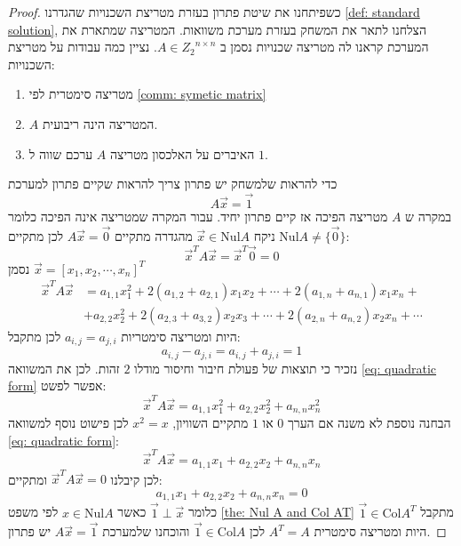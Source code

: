 \documentclass[12pt,leqno]{article}
\theoremstyle{theoremdd}
\newcommand{\Col}{\mathrm{Col}}
\newcommand{\Nul}{\mathrm{Nul}}
\begin{document}
\begin{proof}
    כשפיתחנו את 
    שיטת פתרון 
    בעזרת מטריצת השכנויות 
    שהגדרנו
    \ref{def: standard solution},
    הצלחנו לתאר את המשחק בעזרת 
    מערכת משוואות.
    המטריצה שמתארת את המערכת קראנו לה מטריצה שכנויות
    נסמן ב
    $A \in {Z_2}^{n \times n}$.
    נציין כמה עבודות על מטריצת השכנויות:
    \begin{enumerate}
        \item 
        מטריצה סימטרית לפי
        \ref{comm: symetic matrix}
        \item 
        $A$
        המטריצה הינה ריבועית.
        \item 
        האיברים על האלכסון
        מטריצה 
        $A$
        ערכם שווה ל
        $1$.
    \end{enumerate}

    כדי להראות שלמשחק יש פתרון 
    צריך להראות שקיים פתרון למערכת
    \[A \vec{x} = \vec{1} \]
    במקרה ש 
    $A$
    מטריצה הפיכה אז קיים פתרון יחיד.
    עבור המקרה שמטריצה אינה הפיכה 
    כלומר 
    $\Nul A \neq \{ \vec{0}\}$
    ניקח 
    $\vec{x} \in \Nul A$
    מהגדרה מתקיים
    $A\vec{x} = \vec{0}$
    לכן מתקיים:
    \[\vec{x}^T A \vec{x} = \vec{x}^T\vec{0} = 0\]
    נסמן 
    $\vec{x} = [x_1, x_2, \cdots, x_n]^T$
    \begin{align}
        \label{eq: quadratic form}
            \vec{x}^T A \vec{x} &= a_{1,1}x_1^2 + 2(a_{1,2} + a_{2,1})x_1x_2 + \cdots + 2(a_{1,n} + a_{n,1})x_1x_n +  \\
            \nonumber &+ a_{2,2}x_2^2 +  2(a_{2,3} + a_{3,2})x_2x_3 + \cdots  + 2(a_{2,n} + a_{n,2})x_2x_n + \cdots 
    \end{align}
    היות ומטריצה סימטריות
    $a_{i,j} = a_{j,i}$
    לכן
    מתקבל:
    \[a_{i,j} - a_{j,i} = a_{i,j} + a_{j,i} = 1 \]
    נזכיר כי תוצאות של פעולת חיבור וחיסור מודלו 
    $2$
    זהות.
    לכן
    את המשוואה 
    \ref{eq: quadratic form}
    אפשר לפשט:
    \[ \vec{x}^T A \vec{x} = a_{1,1}x_1^2 + a_{2,2} x_2^2 +  a_{n,n} x_n^2\]
    הבחנה נוספת
    לא משנה אם הערך 
    $0$
    או
    $1$
    מתקיים השוויון,
    $x^2 = x$
    לכן פישוט נוסף למשוואה 
    \ref{eq: quadratic form}:
    \[ \vec{x}^T A \vec{x} = a_{1,1}x_1 + a_{2,2} x_2 +  a_{n,n} x_n\]
    לכן קיבלנו 
    $ \vec{x}^T A \vec{x} = 0$
    ומתקיים:
    \[a_{1,1}x_1 + a_{2,2} x_2 +  a_{n,n} x_n = 0\]
    כלומר 
    $\vec{1} \perp  \vec{x}$
    כאשר 
    $x \in \Nul A$
    לפי משפט 
    \ref{the: Nul A and Col AT}
    מתקבל 
    $\vec{1} \in \Col A^T$
    היות ומטריצה סימטרית 
    $A^T = A$
    לכן
    $\vec{1} \in \Col A$
    והוכחנו שלמערכת
    $A\vec{x} = \vec{1}$
    יש פתרון.
\end{proof}
\end{document}
